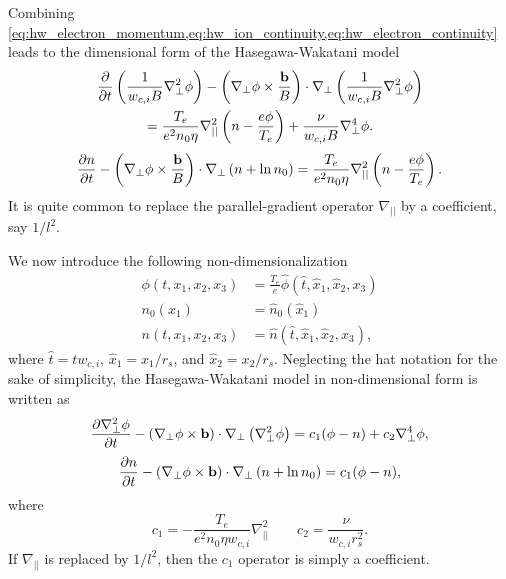 \documentclass[11pt]{article}
\begin{document}
Combining \cref{eq:hw_electron_momentum,eq:hw_ion_continuity,eq:hw_electron_continuity} leads to the dimensional form of the Hasegawa-Wakatani model
\begin{multline}
    \frac{\partial}{\partial t} \left ( \frac{1}{w_{c,i} B} \nabla^2_\perp \phi \right ) - \left (\nabla_\perp \phi \times \frac{\mathbf{b}}{B} \right ) \cdot \nabla_\perp \left ( \frac{1}{w_{c,i} B} \nabla^2_\perp \phi \right ) \\
    = \frac{T_e}{e^2 n_0 \eta} \nabla_{||}^2 \left (n - \frac{e \phi}{T_e} \right ) + \frac{\nu}{w_{c,i} B} \nabla^4_\perp \phi.
\end{multline}
\begin{equation}
    \frac{\partial n}{\partial t} - \left ( \nabla_\perp \phi \times \frac{\mathbf{b}}{B} \right ) \cdot \nabla_\perp \left ( n + \ln n_0 \right ) = \frac{T_e}{e^2 n_0 \eta} \nabla_{||}^2 \left (n - \frac{e \phi}{T_e} \right ).
\end{equation}
It is quite common to replace the parallel-gradient operator $\nabla_{||}$ by a coefficient, say $1/l^2$.

We now introduce the following non-dimensionalization
\begin{align}
    \phi(t,x_1,x_2,x_3) &= \frac{T_e}{e} \hat{\phi}(\hat{t},\hat{x}_1,\hat{x}_2, x_3) \\
    n_0(x_1) &= \hat{n}_0(\hat{x}_1) \\
    n(t,x_1,x_2,x_3) &= \hat{n}(\hat{t}, \hat{x}_1, \hat{x}_2, x_3),
\end{align}
where $\hat{t} = t w_{c,i}$, $\hat{x}_1 = x_1 / r_s$, and $\hat{x}_2 = x_2 / r_s$. Neglecting the hat notation for the sake of simplicity, the Hasegawa-Wakatani model in non-dimensional form is written as
\begin{equation}
    \label{eq:hw_potential}
    \frac{\partial \nabla^2_\perp \phi}{\partial t} - \left (\nabla_\perp \phi \times \mathbf{b} \right ) \cdot \nabla_\perp \left ( \nabla^2_\perp \phi \right ) = c_1 ( \phi - n) + c_2 \nabla^4_\perp \phi,
\end{equation}
\begin{equation}
    \label{eq:hw_density}
    \frac{\partial n}{\partial t} - \left ( \nabla_\perp \phi \times \mathbf{b} \right ) \cdot \nabla_\perp \left ( n + \ln n_0 \right ) = c_1 (\phi - n),
\end{equation}
where
\begin{equation}
    c_1 = -\frac{T_e}{e^2 n_0 \eta w_{c,i}} \nabla^2_{||} \qquad c_2 = \frac{\nu}{w_{c,i} r_s^2}.
\end{equation}
If $\nabla_{||}$ is replaced by $1/l^2$, then the $c_1$ operator is simply a coefficient.
\end{document}
